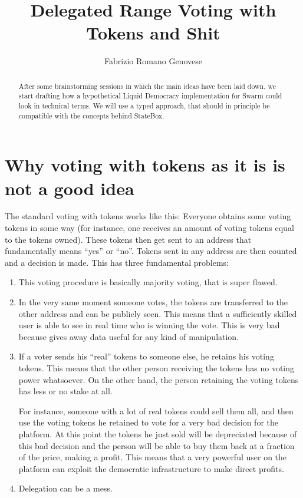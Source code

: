 \documentclass[submission, copyright,creativecommons,sharealike,noncommercial]{eptcs}
\title{Delegated Range Voting with Tokens and Shit}
\author{Fabrizio Romano Genovese
	\institute{Quantum Group \\ University of Oxford}
	\email{fabrizio.genovese@cs.ox.ac.uk}
}
\begin{document}
%	
	
	\maketitle

	\begin{abstract}
		After some brainstorming sessions in which the main ideas have been laid down, we start drafting how a hypothetical Liquid Democracy implementation for Swarm could look in technical terms. We will use a typed approach, that should in principle be compatible with the concepts behind StateBox.
	\end{abstract}

\section{Why voting with tokens as it is is not a good idea}
	The standard voting with tokens works like this: Everyone obtains some voting tokens in some way (for instance, one receives an amount of voting tokens equal to the tokens owned). These tokens then get sent to an address that fundamentally means ``yes'' or ``no''. Tokens sent in any address are then counted and a decision is made. This has three fundamental problems:
	\begin{enumerate}
		\item This voting procedure is basically majority voting, that is super flawed.
		\item In the very same moment someone votes, the tokens are transferred to the other address and can be publicly seen. This means that a sufficiently skilled user is able to see in real time who is winning the vote. This is very bad because gives away data useful for any kind of manipulation.
		\item If a voter sends his ``real'' tokens to someone else, he retains his voting tokens. This means that the other person receiving the tokens has no voting power whatsoever. On the other hand, the person retaining the voting tokens has less or no stake at all.
		
		For instance, someone with a lot of real tokens could sell them all, and then use the voting tokens he retained to vote for a very bad decision for the platform. At this point the tokens he just sold will be depreciated because of this bad decision and the person will be able to buy them back at a fraction of the price, making a profit. This means that a very powerful user on the platform can exploit the democratic infrastructure to make direct profits.
		
		\item Delegation can be a mess.
	\end{enumerate}
\end{document}
